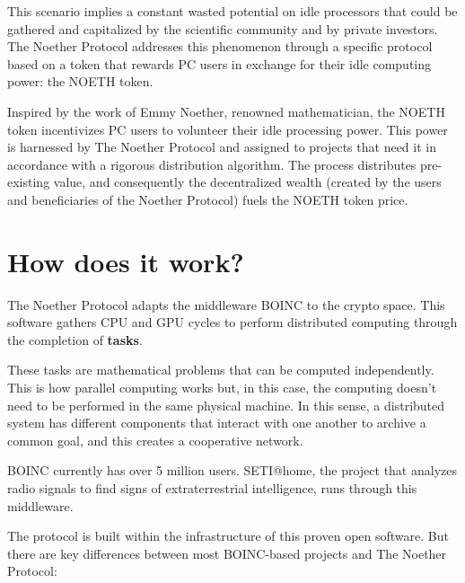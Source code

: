 \documentclass[11pt]{amsart}
\numberwithin{equation}{section}
\theoremstyle{definition}
\theoremstyle{remark}
\renewcommand{\_}[1]{_{\left( #1 \right)}}
\renewcommand{\^}[1]{^{\left( #1 \right)}}
\begin{document}
This scenario implies a constant wasted potential on idle processors that could be gathered and capitalized by the scientific community and by private investors. The Noether Protocol addresses this phenomenon through a specific protocol based on a token that rewards PC users in exchange for their idle computing power: the NOETH token. 

Inspired by the work of Emmy Noether, renowned mathematician, the NOETH token incentivizes PC users to volunteer their idle processing power. This power is harnessed by The Noether Protocol and assigned to projects that need it in accordance with a rigorous distribution algorithm. The process distributes pre-existing value, and consequently the decentralized wealth (created by the users and beneficiaries of the Noether Protocol) fuels the NOETH token price.


\section{How does it work?}

The Noether Protocol adapts the middleware BOINC to the crypto space. This software gathers CPU and GPU cycles to perform distributed computing through the completion of {\bf tasks}. 


These tasks are mathematical problems that can be computed independently. This is how parallel computing works but, in this case, the computing doesn't need to be performed in the same physical machine. In this sense, a distributed system has different components that interact with one another to archive a common goal, and this creates a cooperative network.

BOINC currently has over 5 million users. SETI@home, the project that analyzes radio signals to find signs of extraterrestrial intelligence, runs through this middleware.

The protocol is built within the infrastructure of this proven open software. But there are key differences between most BOINC-based projects and The Noether Protocol:
\end{document}
